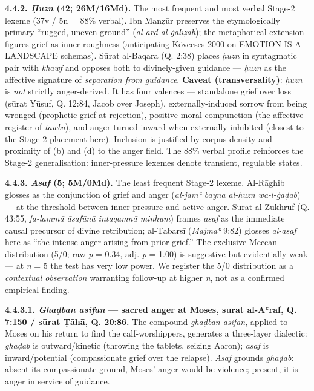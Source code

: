 \textbf{4.4.2. \emph{Ḥuzn} (42; 26M/16Md).} The most frequent and most
verbal Stage-2 lexeme (37v / 5n = 88\% verbal). Ibn Manẓūr preserves the
etymologically primary ``rugged, uneven ground'' (\emph{al-arḍ
al-ġalīẓah}); the metaphorical extension figures grief as inner
roughness (anticipating Kövecses 2000 on EMOTION IS A LANDSCAPE
schemas). Sūrat al-Baqara (Q. 2:38) places \emph{ḥuzn} in syntagmatic
pair with \emph{khawf} and opposes both to divinely-given guidance ---
\emph{ḥuzn} as the affective signature of \emph{separation from
guidance}. \textbf{Caveat (transversality)}: \emph{ḥuzn} is \emph{not}
strictly anger-derived. It has four valences --- standalone grief over
loss (sūrat Yūsuf, Q. 12:84, Jacob over Joseph), externally-induced
sorrow from being wronged (prophetic grief at rejection), positive moral
compunction (the affective register of \emph{tawba}), and anger turned
inward when externally inhibited (closest to the Stage-2 placement
here). Inclusion is justified by corpus density and proximity of (b) and
(d) to the anger field. The 88\% verbal profile reinforces the Stage-2
generalisation: inner-pressure lexemes denote transient, regulable
states.

\textbf{4.4.3. \emph{Asaf} (5; 5M/0Md).} The least frequent Stage-2
lexeme. Al-Rāghib glosses as the conjunction of grief and anger
(\emph{al-jamʿ bayna al-ḥuzn wa-l-ġaḍab}) --- at the threshold between
inner pressure and active anger. Sūrat al-Zukhruf (Q. 43:55,
\emph{fa-lammā āsafūnā intaqamnā minhum}) frames \emph{asaf} as the
immediate causal precursor of divine retribution; al-Ṭabarsī
(\emph{Majmaʿ} 9:82) glosses \emph{al-asaf} here as ``the intense anger
arising from prior grief.'' The exclusive-Meccan distribution (5/0; raw
\emph{p} = 0.34, adj. \emph{p} = 1.00) is suggestive but evidentially
weak --- at \emph{n} = 5 the test has very low power. We register the
5/0 distribution as a \emph{contextual observation} warranting follow-up
at higher \emph{n}, not as a confirmed empirical finding.

\textbf{4.4.3.1. \emph{Ghaḍbān asifan} --- sacred anger at Moses, sūrat
al-Aʿrāf, Q. 7:150 / sūrat Ṭāhā, Q. 20:86.} The compound \emph{ghaḍbān
asifan}, applied to Moses on his return to find the calf-worshippers,
generates a three-layer dialectic: \emph{ghaḍab} is outward/kinetic
(throwing the tablets, seizing Aaron); \emph{asaf} is inward/potential
(compassionate grief over the relapse). \emph{Asaf} grounds
\emph{ghaḍab}: absent its compassionate ground, Moses' anger would be
violence; present, it is anger in service of guidance.

